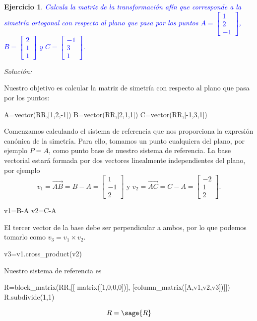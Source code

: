 \documentclass{amsart}
\newtheorem{ejer}{Ejercicio}
\begin{document}
\newpage

\begin{ejer}
\textcolor{blue}{Calcula la matriz de la transformación afín que corresponde a la simetría ortogonal con respecto al plano que pasa por los puntos $A = \left[ \begin{array}{r} 1 \\ 2 \\ -1 \end{array} \right]$, $B = \left[ \begin{array}{r} 2 \\ 1 \\ 1 \end{array} \right]$ y $C = \left[ \begin{array}{r} -1 \\ 3 \\ 1 \end{array} \right]$.}
\end{ejer}

{\it Solución:}

Nuestro objetivo es calcular la matriz de simetría con respecto al plano que pasa por los puntos:
\begin{sageblock}
A=vector(RR,[1,2,-1])
B=vector(RR,[2,1,1])
C=vector(RR,[-1,3,1])
\end{sageblock}
Comenzamos calculando el sistema de referencia que nos proporciona la expresión canónica de la simetría.  Para ello, tomamos un punto cualquiera del plano, por ejemplo $P = A$, como punto base de nuestro sistema de referencia. La base vectorial estará formada por dos vectores linealmente independientes del plano, por ejemplo $$v_1 = \vec{AB} = B - A = \left[ \begin{array}{r} 1 \\ -1 \\ 2 \end{array} \right] \text{ y } v_2 = \vec{AC} = C - A = \left[ \begin{array}{r} -2 \\ 1 \\ 2 \end{array} \right].$$ 

\begin{sageblock}
v1=B-A
v2=C-A
\end{sageblock}
El tercer vector de la base debe ser perpendicular a ambos, por lo que podemos tomarlo como $v_3 = v_1\times v_2$. 
\begin{sageblock}
v3=v1.cross_product(v2)
\end{sageblock}
Nuestro sistema de referencia es 
\begin{sageblock}
R=block_matrix(RR,[[       matrix([1,0,0,0])],
                [column_matrix([A,v1,v2,v3])]])
R.subdivide(1,1)
\end{sageblock}
\[ R = \sage{R}\] 
\end{document}
